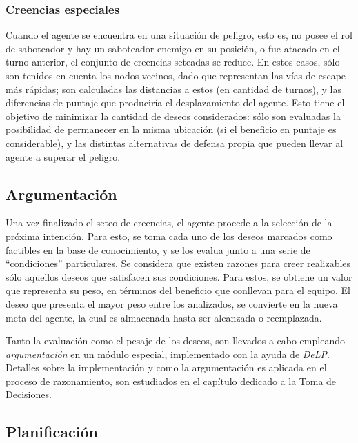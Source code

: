 \documentclass[oneside]{book}
\begin{document}
\subsubsection{Creencias especiales} %

Cuando el agente se encuentra en una situación de peligro, esto es, no posee el rol de 
saboteador y hay un saboteador enemigo en su posición, o fue atacado en el turno anterior, 
el conjunto de creencias seteadas se reduce. En estos casos, sólo son tenidos en cuenta 
los nodos vecinos, dado que representan las vías de escape más rápidas; son calculadas 
las distancias a estos (en cantidad de turnos), y las diferencias de puntaje que produciría 
el desplazamiento del agente. Esto tiene el objetivo de minimizar la cantidad de deseos 
considerados: sólo son evaluadas la posibilidad de permanecer en la misma ubicación 
(si el beneficio en puntaje es considerable), y las distintas alternativas de defensa 
propia que pueden llevar al agente a superar el peligro.

\subsection{Argumentación}

\label{sec:argumentacion}

Una vez finalizado el seteo de creencias, el agente procede a la selección de la próxima 
intención. Para esto, se toma cada uno de los deseos marcados como factibles en la base 
de conocimiento, y se los evalua junto a una serie de ``condiciones'' particulares. Se 
considera que existen razones para creer realizables sólo aquellos deseos que satisfacen 
sus condiciones. Para estos, se obtiene un valor que representa su peso, en términos del 
beneficio que conllevan para el equipo. El deseo que presenta el mayor peso entre los 
analizados, se convierte en la nueva meta del agente, la cual es almacenada hasta ser 
alcanzada o reemplazada.

Tanto la evaluación como el pesaje de los deseos, son llevados a cabo empleando \textit{argumentación} 
en un módulo especial, implementado con la ayuda de \textit{DeLP}. 
Detalles sobre la implementación y como la argumentación es aplicada en el proceso de 
razonamiento, son estudiados en el capítulo dedicado a la Toma de Decisiones. %

\subsection{Planificación}
\end{document}
